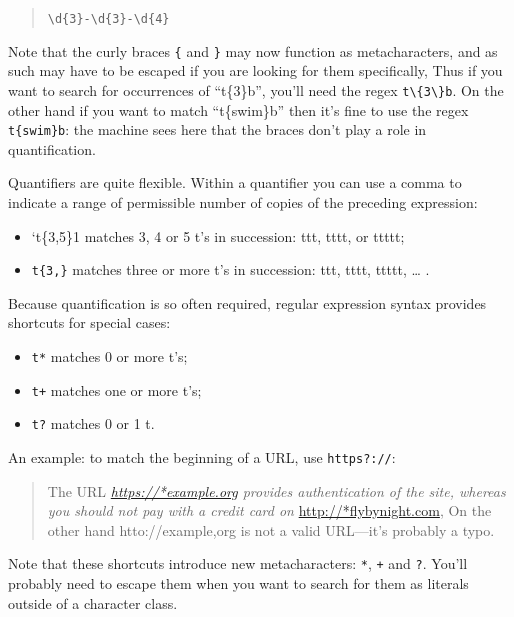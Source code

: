 \documentclass[]{book}
\providecommand{\tightlist}{%
  \setlength{\itemsep}{0pt}\setlength{\parskip}{0pt}}
\theoremstyle{definition}
\theoremstyle{definition}
\theoremstyle{definition}
\theoremstyle{remark}
\begin{document}
{\begin{quote}
\texttt{\textbackslash{}d\{3\}-\textbackslash{}d\{3\}-\textbackslash{}d\{4\}}
\end{quote}

Note that the curly braces \texttt{\{} and \texttt{\}} may now function
as metacharacters, and as such may have to be escaped if you are looking
for them specifically, Thus if you want to search for occurrences of
``t\{3\}b'', you'll need the regex
\texttt{t\textbackslash{}\{3\textbackslash{}\}b}. On the other hand if
you want to match ``t\{swim\}b'' then it's fine to use the regex
\texttt{t\{swim\}b}: the machine sees here that the braces don't play a
role in quantification.

Quantifiers are quite flexible. Within a quantifier you can use a comma
to indicate a range of permissible number of copies of the preceding
expression:

\begin{itemize}
\tightlist
\item
  `t\{3,5\}1 matches 3, 4 or 5 t's in succession: ttt, tttt, or ttttt;
\item
  \texttt{t\{3,\}} matches three or more t's in succession: ttt, tttt,
  ttttt, \ldots{} .
\end{itemize}

Because quantification is so often required, regular expression syntax
provides shortcuts for special cases:

\begin{itemize}
\tightlist
\item
  \texttt{t*} matches 0 or more t's;
\item
  \texttt{t+} matches one or more t's;
\item
  \texttt{t?} matches 0 or 1 t.
\end{itemize}

An example: to match the beginning of a URL, use \texttt{https?://}:

\begin{quote}
The URL \emph{\url{https://*example.org} provides authentication of the
site, whereas you should not pay with a credit card on
}\url{http://*flybynight.com}, On the other hand htto://example,org is
not a valid URL---it's probably a typo.
\end{quote}

Note that these shortcuts introduce new metacharacters: \texttt{*},
\texttt{+} and \texttt{?}. You'll probably need to escape them when you
want to search for them as literals outside of a character class.

}
\end{document}
